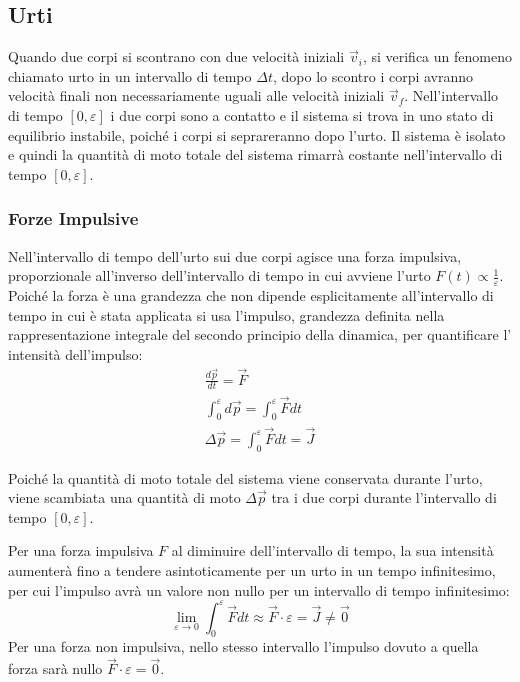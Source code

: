 \documentclass{article}
\numberwithin{equation}{subsection}
\begin{document}
\subsection{Urti}
Quando due corpi si scontrano con due velocità iniziali $\vec{v}_i$, 
si verifica un fenomeno 
chiamato urto in un intervallo di tempo $\Delta t$, dopo 
lo scontro i corpi avranno velocità finali non necessariamente 
uguali alle velocità iniziali $\vec{v}_f$. Nell'intervallo di tempo 
$[0,\varepsilon]$ i due corpi sono a contatto e il sistema si trova 
in uno stato di equilibrio instabile, poiché i corpi si 
seprareranno dopo l'urto. Il sistema è isolato e quindi la 
quantità di moto totale del sistema rimarrà costante nell'intervallo 
di tempo $[0,\varepsilon]$. 

 
\subsubsection{Forze Impulsive}
Nell'intervallo di tempo dell'urto sui due corpi agisce una 
forza impulsiva, proporzionale all'inverso dell'intervallo di tempo in cui avviene l'urto 
$F(t)\propto \displaystyle\frac{1}{\varepsilon}$. 
Poiché la forza è una grandezza che non dipende esplicitamente all'intervallo di 
tempo in cui è stata applicata si usa l'impulso, grandezza definita nella rappresentazione integrale del secondo principio della dinamica, per quantificare 
l'\\intensità dell'impulso: 
\begin{gather*}
    \displaystyle\frac{d\vec{p}}{dt}=\vec{F}\\
    \displaystyle\int_{0}^{\varepsilon}d\vec{p}=\int_{0}^{\varepsilon}\vec{F}dt\\
    \Delta\vec{p}=\displaystyle\int_{0}^{\varepsilon}\vec{F}dt=\vec{J}
\end{gather*}

Poiché la quantità di moto totale del sistema viene conservata 
durante l'urto, viene scambiata una quantità di moto $\Delta\vec{p}$ 
tra i due corpi durante l'intervallo di tempo $[0,\varepsilon]$. 

Per una forza impulsiva $F$ al diminuire dell'intervallo di tempo, la sua intensità aumenterà fino a tendere asintoticamente per un urto in un tempo infinitesimo, per cui 
l'impulso avrà un valore non nullo per un intervallo di tempo infinitesimo:
\begin{equation*}
    \lim_{\varepsilon\to 0}\displaystyle\int_{0}^{\varepsilon}\vec{F}dt\approx\vec{F}\cdot\varepsilon=\vec{J}\neq\vec{0}
\end{equation*}
Per una forza non impulsiva, nello stesso intervallo l'impulso dovuto a quella forza sarà nullo $\vec{F}\cdot\varepsilon=\vec{0}$. 
\end{document}
